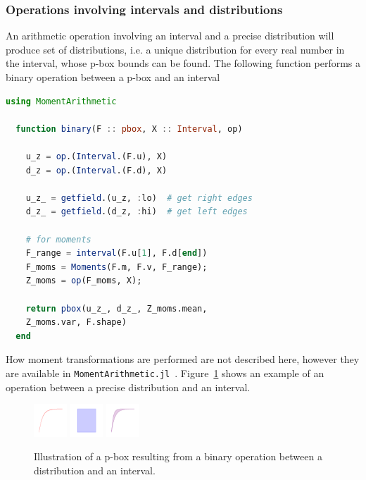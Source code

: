 \documentclass{juliacon}
\begin{document}
\subsubsection{Operations involving intervals and distributions}
An arithmetic operation involving an interval and a precise distribution will produce set of distributions, i.e. a unique distribution for every real number in the interval, whose p-box bounds can be found. The following function performs a binary operation between a p-box and an interval
\begin{lstlisting}[language = Julia]
  using MomentArithmetic

  function binary(F :: pbox, X :: Interval, op)

    u_z = op.(Interval.(F.u), X)
    d_z = op.(Interval.(F.d), X)

    u_z_ = getfield.(u_z, :lo)  # get right edges
    d_z_ = getfield.(d_z, :hi)  # get left edges

    # for moments
    F_range = interval(F.u[1], F.d[end])
    F_moms = Moments(F.m, F.v, F_range);
    Z_moms = op(F_moms, X);

    return pbox(u_z_, d_z_, Z_moms.mean, 
    Z_moms.var, F.shape)
  end
\end{lstlisting}
\noindent How moment transformations are performed are not described here, however they are available in \texttt{MomentArithmetic.jl}~\cite{ferson2021distribution}. Figure~\ref{fig:figure4} shows an example of an operation between a precise distribution and an interval.
\begin{figure}[h!]
  \centering
  \includegraphics[width=0.11\textwidth]{../examples/JuliaCon/fig4/fig4_dist.pdf}
  \raisebox{8.0mm}{\noindent\Large*}
  \includegraphics[width=0.11\textwidth]{../examples/JuliaCon/fig4/fig4_in.pdf}
  \raisebox{9.0mm}{{\Large$\rightarrow$}}
  \includegraphics[width=0.11\textwidth]{../examples/JuliaCon/fig4/fig4_pbox.pdf}
  \caption{Illustration of a p-box resulting from a binary operation between a distribution and an interval.}
  \label{fig:figure4}
\end{figure}
\end{document}
